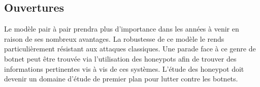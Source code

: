 \subsection{Ouvertures}

Le modèle pair à pair prendra plus d'importance dans les années à venir en raison
de ses nombreux avantages. La robustesse de ce modèle le rends particulièrement résistant aux attaques
classiques. Une parade face à ce genre de botnet peut être trouvée via l'utilisation des honeypots afin
de trouver des informations pertinentes vis à vis de ces systèmes. L'étude des honeypot doit devenir
un domaine d'étude de premier plan pour lutter contre les botnets.

